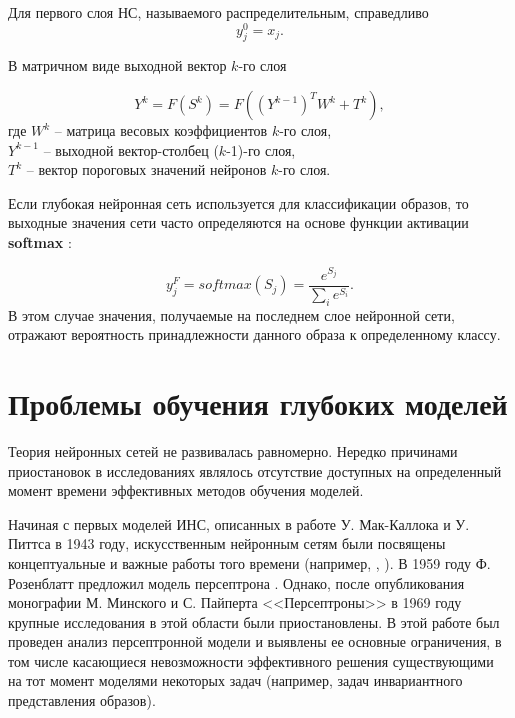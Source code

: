 Для первого слоя НС, называемого распределительным, справедливо		
\begin{equation}
y_j^0=x_j.
\end{equation}

В матричном виде выходной вектор $k$-го слоя 

\begin{equation}
Y^k=F(S^k)=F((Y^{k-1})^TW^k+T^k),
\end{equation}
где $W^k$ -- матрица весовых коэффициентов $k$-го слоя,\\
$Y^{k-1}$ -- выходной вектор-столбец ($k$-1)-го слоя,\\
$T^k$ -- вектор пороговых значений нейронов $k$-го слоя.

Если глубокая нейронная сеть используется для классификации образов, то выходные значения сети часто определяются на основе функции активации \textbf{softmax} \cite{golovko2017}: 		

\begin{equation}
y_j^F=softmax(S_j)=\frac{e^{S_j}}{\sum_i e^{S_i}}.
\end{equation}
В этом случае значения, получаемые на последнем слое нейронной сети, отражают вероятность принадлежности данного образа к определенному классу.

\section{Проблемы обучения глубоких моделей}

Теория нейронных сетей не развивалась равномерно. Нередко причинами приостановок в исследованиях являлось отсутствие доступных на определенный момент времени эффективных методов обучения моделей. 

Начиная с первых моделей ИНС, описанных в работе У. Мак-Каллока и У. Питтса \cite{mcculloch43a} в 1943 году, искусственным нейронным сетям были посвящены концептуальные и важные работы того времени (например, \cite{hebb1949}, \cite{widrow1960}). В 1959 году Ф. Розенблатт предложил модель персептрона \cite{rosenblatt1959}. Однако, после опубликования монографии М. Минского и С. Пайперта <<Персептроны>> в 1969 году \cite{minsky69perceptrons} крупные исследования в этой области были приостановлены. В этой работе был проведен анализ персептронной модели и выявлены ее основные ограничения, в том числе касающиеся невозможности эффективного решения существующими на тот момент моделями некоторых задач (например, задач инвариантного представления образов). %

